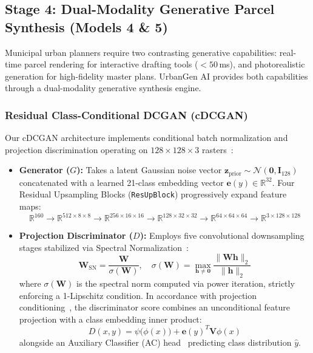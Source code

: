 \documentclass[journal]{IEEEtran}
\begin{document}
\subsection{Stage 4: Dual-Modality Generative Parcel Synthesis (Models 4 & 5)}
Municipal urban planners require two contrasting generative capabilities: real-time parcel rendering for interactive drafting tools ($<50$\,ms), and photorealistic generation for high-fidelity master plans. UrbanGen AI provides both capabilities through a dual-modality generative synthesis engine.

\subsubsection{Residual Class-Conditional DCGAN (cDCGAN)}
Our cDCGAN architecture implements conditional batch normalization and projection discrimination operating on $128 \times 128 \times 3$ rasters~\cite{radford2015unsupervised,mirza2014conditional}:
\begin{itemize}
    \item \textbf{Generator ($G$):} Takes a latent Gaussian noise vector $\mathbf{z}_{\text{prior}} \sim \mathcal{N}(\mathbf{0}, \mathbf{I}_{128})$ concatenated with a learned 21-class embedding vector $\mathbf{e}(y) \in \mathbb{R}^{32}$. Four Residual Upsampling Blocks (\texttt{ResUpBlock}) progressively expand feature maps:
    \begin{equation}
    \mathbb{R}^{160} \to \mathbb{R}^{512 \times 8 \times 8} \to \mathbb{R}^{256 \times 16 \times 16} \to \mathbb{R}^{128 \times 32 \times 32} \to \mathbb{R}^{64 \times 64 \times 64} \to \mathbb{R}^{3 \times 128 \times 128}
    \end{equation}
    \item \textbf{Projection Discriminator ($D$):} Employs five convolutional downsampling stages stabilized via Spectral Normalization~\cite{miyato2018spectral}:
    \begin{equation}
    \mathbf{W}_{\text{SN}} = \frac{\mathbf{W}}{\sigma(\mathbf{W})}, \quad \sigma(\mathbf{W}) = \max_{\mathbf{h} \ne \mathbf{0}} \frac{\|\mathbf{W}\mathbf{h}\|_2}{\|\mathbf{h}\|_2}
    \label{eq:spectral_norm}
    \end{equation}
    where $\sigma(\mathbf{W})$ is the spectral norm computed via power iteration, strictly enforcing a 1-Lipschitz condition. In accordance with projection conditioning~\cite{miyato2018cgans}, the discriminator score combines an unconditional feature projection with a class embedding inner product:
    \begin{equation}
    D(x, y) = \psi\big(\phi(x)\big) + \mathbf{e}(y)^T \mathbf{V} \phi(x)
    \label{eq:proj_disc}
    \end{equation}
    alongside an Auxiliary Classifier (AC) head~\cite{odena2017conditional} predicting class distribution $\hat{y}$.
\end{itemize}
\end{document}
